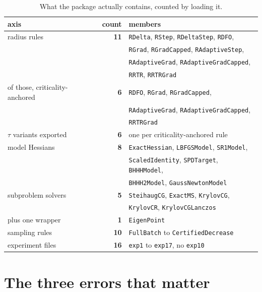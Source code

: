 \documentclass[11pt,a4paper]{article}
\begin{document}
\begin{table}[H]
  \centering\small
  \caption{What the package actually contains, counted by loading it.}
  \label{tab: counts}
  \begin{tabular}{lrl}
    \toprule
    axis & count & members \\
    \midrule
    radius rules & \textbf{11}
      & \texttt{RDelta}, \texttt{RStep}, \texttt{RDeltaStep}, \texttt{RDFO}, \\
      & & \texttt{RGrad}, \texttt{RGradCapped}, \texttt{RAdaptiveStep}, \\
      & & \texttt{RAdaptiveGrad}, \texttt{RAdaptiveGradCapped}, \\
      & & \texttt{RRTR}, \texttt{RRTRGrad} \\
    \midrule
    of those, criticality-anchored & \textbf{6}
      & \texttt{RDFO}, \texttt{RGrad}, \texttt{RGradCapped}, \\
      & & \texttt{RAdaptiveGrad}, \texttt{RAdaptiveGradCapped}, \\
      & & \texttt{RRTRGrad} \\
    \midrule
    $\tau$ variants exported & \textbf{6}
      & one per criticality-anchored rule \\
    \midrule
    model Hessians & \textbf{8}
      & \texttt{ExactHessian}, \texttt{LBFGSModel}, \texttt{SR1Model}, \\
      & & \texttt{ScaledIdentity}, \texttt{SPDTarget}, \texttt{BHHHModel}, \\
      & & \texttt{BHHH2Model}, \texttt{GaussNewtonModel} \\
    \midrule
    subproblem solvers & \textbf{5}
      & \texttt{SteihaugCG}, \texttt{ExactMS}, \texttt{KrylovCG}, \\
      & & \texttt{KrylovCR}, \texttt{KrylovCGLanczos} \\
    \midrule
    plus one wrapper & \textbf{1} & \texttt{EigenPoint} \\
    \midrule
    sampling rules & \textbf{10}
      & \texttt{FullBatch} to \texttt{CertifiedDecrease} \\
    \midrule
    experiment files & \textbf{16} & \texttt{exp1} to \texttt{exp17}, no \texttt{exp10} \\
    \bottomrule
  \end{tabular}
\end{table}

\section{The three errors that matter}\label{sec: three}
\end{document}
